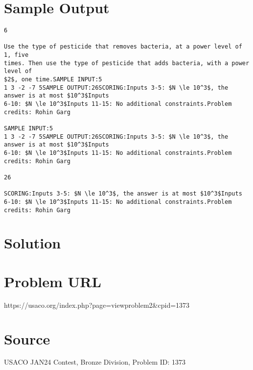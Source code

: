 \documentclass[12pt]{article}
\begin{document}
\section*{Sample Output}
\begin{verbatim}
6

Use the type of pesticide that removes bacteria, at a power level of 1, five
times. Then use the type of pesticide that adds bacteria, with a power level of
$2$, one time.SAMPLE INPUT:5
1 3 -2 -7 5SAMPLE OUTPUT:26SCORING:Inputs 3-5: $N \le 10^3$, the answer is at most $10^3$Inputs
6-10: $N \le 10^3$Inputs 11-15: No additional constraints.Problem credits: Rohin Garg

SAMPLE INPUT:5
1 3 -2 -7 5SAMPLE OUTPUT:26SCORING:Inputs 3-5: $N \le 10^3$, the answer is at most $10^3$Inputs
6-10: $N \le 10^3$Inputs 11-15: No additional constraints.Problem credits: Rohin Garg

26

SCORING:Inputs 3-5: $N \le 10^3$, the answer is at most $10^3$Inputs
6-10: $N \le 10^3$Inputs 11-15: No additional constraints.Problem credits: Rohin Garg
\end{verbatim}

\section*{Solution}


\section*{Problem URL}
https://usaco.org/index.php?page=viewproblem2&cpid=1373

\section*{Source}
USACO JAN24 Contest, Bronze Division, Problem ID: 1373
\end{document}

